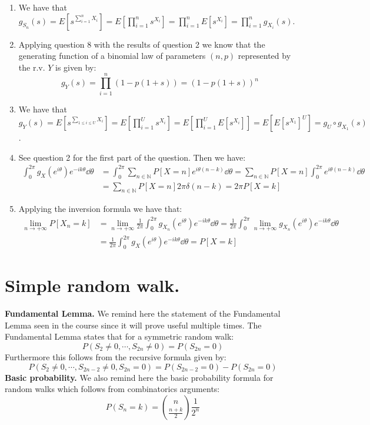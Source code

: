 \documentclass[10pt,a4paper]{article}
\begin{document}
\begin{enumerate}
\item We have that $g_{S_n}(s) = E[s^{\sum_{i = 1}^n X_i}] = E[\prod_{i = 1}^n s^{X_i}] = \prod_{i = 1}^n E[s^{X_i}] = \prod_{i = 1}^n g_{X_i}(s)$.

\item Applying question 8 with the results of question 2 we know that the generating function of a binomial law of parameters $(n, p)$ represented by the r.v. $Y$ is given by:
\[
g_Y(s) = \prod_{i = 1}^n (1 - p(1 + s)) = (1 - p(1 + s))^n
\]

\item We have that $g_Y(s) = E[s^{\sum_{1 \leq i \leq U} X_i}] = E[\prod_{i = 1}^U s^{X_i}] = E[\prod_{i = 1}^U E[s^{X_i}]] = E[E[s^{X_1}]^U] = g_U \circ g_{X_1} (s)$.

\item See question 2 for the first part of the question. Then we have:
\begin{align*}
\int_0^{2\pi} g_X(e^{i \theta}) e^{- i k \theta} \dd \theta &= \int_{0}^{2 \pi} \sum_{n \in \mathbb{N}} P[X = n] e^{i \theta(n - k)} \dd \theta = \sum_{n \in \mathbb{N}} P[X = n] \int_0^{2 \pi} e^{i \theta ( n -k )} \dd \theta \\
&= \sum_{n \in \mathbb{N}} P[X = n] 2 \pi \delta(n - k) = 2 \pi P[X = k]  
\end{align*}  

\item Applying the inversion formula we have that:
\begin{align*}
\lim_{n \to +\infty} P[X_n = k] &= \lim_{n \to +\infty} \frac{1}{2\pi} \int_0^{2\pi} g_{X_n}(e^{i\theta})e^{-ik\theta} \dd \theta = \frac{1}{2\pi} \int_0^{2\pi} \lim_{n \to +\infty} g_{X_n}(e^{i\theta})e^{- i k \theta} \dd \theta \\
&= \frac{1}{2\pi}\int_0^{2\pi} g_{X}(e^{i\theta})e^{-ik\theta} \dd \theta = P[X = k]
\end{align*}
\end{enumerate}

\section{Simple random walk.}

\textbf{Fundamental Lemma.} We remind here the statement of the Fundamental Lemma seen in the course since it will prove useful multiple times. The Fundamental Lemma states that for a symmetric random walk:
\[
P(S_{2} \neq 0, \cdots, S_{2n} \neq 0) = P(S_{2n} = 0)
\]
Furthermore this follows from the recursive formula given by:
\[
P(S_2 \neq 0, \cdots, S_{2n-2} \neq 0, S_{2n} = 0) = P(S_{2n - 2} = 0) -  P(S_{2n} = 0)
\]
\textbf{Basic probability.} We also remind here the basic probability formula for random walks which follows from combinatorics arguments:
\[
P(S_n = k) = \binom{n}{\frac{n + k}{2}} \frac{1}{2^n}
\]\\
\end{document}
